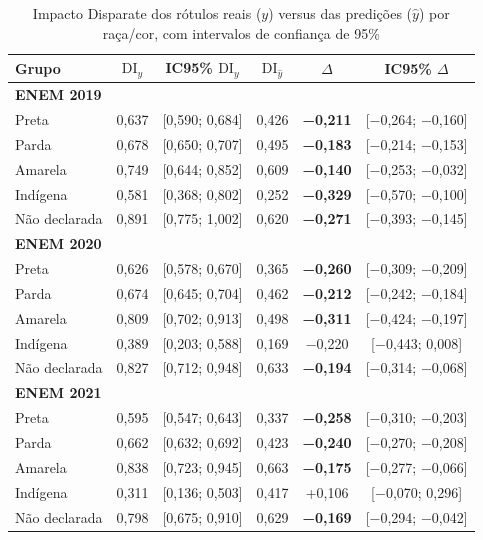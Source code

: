 \begin{table}[htbp]
\centering
\caption{Impacto Disparate dos rótulos reais ($y$) versus das predições ($\hat{y}$) por raça/cor, com intervalos de confiança de 95\%}
\label{tab:amplificacao}
\begin{tabular}{lccccc}
\toprule
\textbf{Grupo} & $\mathrm{DI}_y$ & \textbf{IC95\%} $\mathrm{DI}_y$ & $\mathrm{DI}_{\hat{y}}$ & $\Delta$ & \textbf{IC95\%} $\Delta$ \\
\midrule
\multicolumn{6}{l}{\textbf{ENEM 2019}} \\
\quad Preta & 0,637 & [0,590; 0,684] & 0,426 & \textbf{−0,211} & [−0,264; −0,160] \\
\quad Parda & 0,678 & [0,650; 0,707] & 0,495 & \textbf{−0,183} & [−0,214; −0,153] \\
\quad Amarela & 0,749 & [0,644; 0,852] & 0,609 & \textbf{−0,140} & [−0,253; −0,032] \\
\quad Indígena & 0,581 & [0,368; 0,802] & 0,252 & \textbf{−0,329} & [−0,570; −0,100] \\
\quad Não declarada & 0,891 & [0,775; 1,002] & 0,620 & \textbf{−0,271} & [−0,393; −0,145] \\
\midrule
\multicolumn{6}{l}{\textbf{ENEM 2020}} \\
\quad Preta & 0,626 & [0,578; 0,670] & 0,365 & \textbf{−0,260} & [−0,309; −0,209] \\
\quad Parda & 0,674 & [0,645; 0,704] & 0,462 & \textbf{−0,212} & [−0,242; −0,184] \\
\quad Amarela & 0,809 & [0,702; 0,913] & 0,498 & \textbf{−0,311} & [−0,424; −0,197] \\
\quad Indígena & 0,389 & [0,203; 0,588] & 0,169 & −0,220 & [−0,443; 0,008] \\
\quad Não declarada & 0,827 & [0,712; 0,948] & 0,633 & \textbf{−0,194} & [−0,314; −0,068] \\
\midrule
\multicolumn{6}{l}{\textbf{ENEM 2021}} \\
\quad Preta & 0,595 & [0,547; 0,643] & 0,337 & \textbf{−0,258} & [−0,310; −0,203] \\
\quad Parda & 0,662 & [0,632; 0,692] & 0,423 & \textbf{−0,240} & [−0,270; −0,208] \\
\quad Amarela & 0,838 & [0,723; 0,945] & 0,663 & \textbf{−0,175} & [−0,277; −0,066] \\
\quad Indígena & 0,311 & [0,136; 0,503] & 0,417 & +0,106 & [−0,070; 0,296] \\
\quad Não declarada & 0,798 & [0,675; 0,910] & 0,629 & \textbf{−0,169} & [−0,294; −0,042] \\
\bottomrule
\end{tabular}
\end{table}
